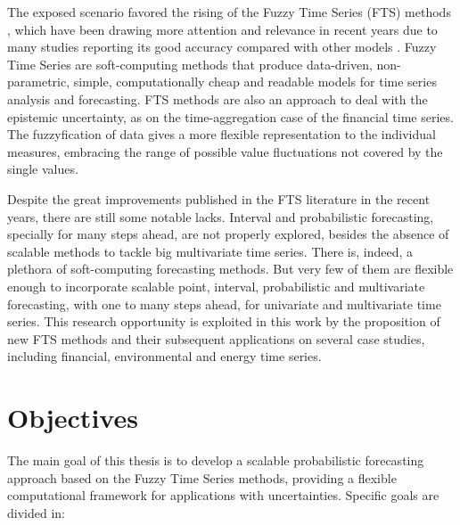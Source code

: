 The exposed scenario favored the rising of the Fuzzy Time Series (FTS) methods \cite{song1993fuzzy}, which have been drawing more  attention and relevance in recent years due to many studies reporting its good accuracy compared with other models \cite{Singh2008}. Fuzzy Time Series are soft-computing methods that produce data-driven, non-parametric, simple, computationally cheap and readable models for time series analysis and forecasting. FTS methods are also an approach to deal with  the  epistemic uncertainty, as on the time-aggregation case of the financial time series. The fuzzyfication of data gives a more flexible representation to the individual measures, embracing the range of possible value fluctuations not covered by the single values. 

Despite the great improvements published in the FTS literature in the recent years, there are still some notable lacks. Interval and probabilistic forecasting, specially for many steps ahead, are not properly explored, besides the absence of scalable methods to tackle big multivariate time series. There is, indeed, a plethora of soft-computing forecasting methods. But very few of them are flexible enough to incorporate scalable point, interval, probabilistic and multivariate forecasting, with one to many steps ahead, for univariate and multivariate time series. This research opportunity is exploited in this work by the proposition of new FTS methods and their subsequent applications on several case studies, including financial, environmental and energy time series. 

\section{Objectives}  

The main goal of this thesis is to develop a scalable probabilistic forecasting approach based on the Fuzzy Time Series methods, providing a flexible computational framework for applications with uncertainties. Specific goals are divided in:


